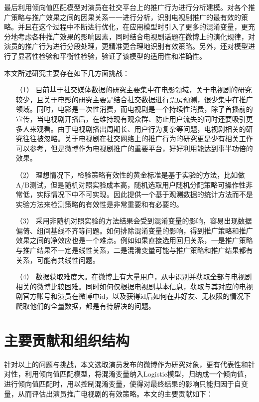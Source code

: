 最后利用倾向值匹配模型对演员在社交平台上的推广行为进行分析建模。对各个推广策略与推广效果之间的因果关系一一进行分析，识别电视剧推广的最有效的策略。并且在这个过程中不断进行优化，在应用模型时引入了更多的混淆变量，更充分地考虑各种推广效果的影响因素，同时结合电视剧话题在微博上的演化规律，对演员的推广行为进行分段处理，更精准更合理地识别有效策略。另外，还对模型进行了显著性检验和平衡性检验，验证了该模型的适用性和准确性。

本文所述研究主要存在如下几方面挑战：

\begin{itemize}

\item[（1）]目前基于社交媒体数据的研究主要集中在电影领域，关于电视剧的研究较少，且关于电影的研究主要是结合社交数据进行票房预测，很少集中在推广领域。同时，电影是一次性消费，而电视剧是一个持续性消费，除了首播前的宣传，当电视剧开播后，在维持现有观众群、防止用户流失的同时还要吸引更多人来观看。由于电视剧播出周期长、用户行为复杂等问题，电视剧相关的研究往往被忽略。关于电视剧在社交网络上的推广行为的研究更是少有相关工作可以参考，但是微博作为电视剧推广的重要平台，好好利用能达到事半功倍的效果。

\item[（2）]理想情况下，检验策略有效性的黄金标准是基于实验的方法，比如做A/B测试，但是随机对照实验成本高，随机选取用户随机分配策略可操作性非常低，实际情况下中不可实现。因此提供一个基于观测数据的统计方法而不是实验方法来检测策略的有效性是非常重要和有必要的。

\item[（3）]采用非随机对照实验的方法结果会受到混淆变量的影响，容易出现数据偏倚、组间基线不齐等问题。如何排除混淆变量的影响，得到推广策略和推广效果之间的净效应也是一个难点。例如如果直接选用回归关系，一是推广策略与推广结果不一定是线性关系，二是混淆变量可能与推广策略和推广结果都有关系，可能有共线性问题。

\item[（4）]数据获取难度大。在微博上有大量用户，从中识别并获取全部与电视剧相关的微博比较困难。同时如何仅根据电视剧基本信息，获取与其对应的电视剧官方账号和演员在微博中id，以及获得id后如何在非好友、无权限的情况下爬取他们的全量数据，都是有待解决的问题。


\end{itemize}

\section{主要贡献和组织结构}

针对以上的问题与挑战，本文选取演员发布的微博作为研究对象，更有代表性和针对性，利用倾向值匹配模型，将混淆变量纳入Logistic模型，归纳成一个倾向值，进行倾向值匹配时，用以控制混淆变量，使得对最终结果的影响只能归因于自变量，从而评估出演员推广电视剧的有效策略。本文的主要贡献如下：

